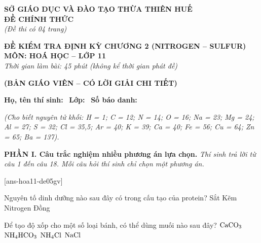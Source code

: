 \documentclass[12pt,a4paper]{article}
\begin{document}
\thispagestyle{firstpage}

\noindent
\begin{minipage}[t]{0.44\textwidth}
	\centering\fontsize{10pt}{12pt}\selectfont
	\textbf{SỞ GIÁO DỤC VÀ ĐÀO TẠO THỪA THIÊN HUẾ}\\
	\textbf{ĐỀ CHÍNH THỨC}\\
	\textit{(Đề thi có 04 trang)}
\end{minipage}\hfill
\begin{minipage}[t]{0.54\textwidth}
	\centering\small
	\textbf{ĐỀ KIỂM TRA ĐỊNH KỲ CHƯƠNG 2 (NITROGEN -- SULFUR)}\\
	\textbf{MÔN: HOÁ HỌC -- LỚP 11}\\
	\textit{Thời gian làm bài: 45 phút (không kể thời gian phát đề)}\\
\end{minipage}

\smallskip
\begin{center}
	{\color{hfRed}\textbf{\large (BẢN GIÁO VIÊN -- CÓ LỜI GIẢI CHI TIẾT)}}
\end{center}

\smallskip
\noindent\hrulefill
\smallskip

\noindent\textbf{Họ, tên thí sinh:} \dotfill\ \textbf{Lớp:} \dotfill\ \textbf{Số báo danh:} \dotfill

\smallskip
\noindent\textit{(Cho biết nguyên tử khối: H = 1; C = 12; N = 14; O = 16; Na = 23; Mg = 24; Al = 27; S = 32; Cl = 35,5; Ar = 40; K = 39; Ca = 40; Fe = 56; Cu = 64; Zn = 65; Ba = 137).}
\smallskip

\noindent\textbf{\large PHẦN I. Câu trắc nghiệm nhiều phương án lựa chọn.}
\textit{Thí sinh trả lời từ câu 1 đến câu 18. Mỗi câu hỏi thí sinh chỉ chọn một phương án.}
\vspace{0.2cm}

[ans-hoa11-de05gv]

\begin{ex}
Nguyên tố dinh dưỡng nào sau đây có trong cấu tạo của protein?
\choice
{Sắt}
{Kẽm}
{\True Nitrogen}
{Đồng}

\end{ex}

\begin{ex}
Để tạo độ xốp cho một số loại bánh, có thể dùng muối nào sau đây?
\choice
{$\ce{CaCO3}$}
{\True $\ce{NH4HCO3}$}
{$\ce{NH4Cl}$}
{$\ce{NaCl}$}

\end{ex}
\end{document}
